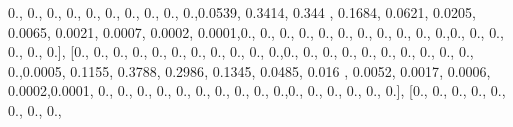 \documentclass[
]{book}
\newenvironment{Shaded}{\begin{snugshade}}{\end{snugshade}}
\newcommand{\FloatTok}[1]{\textcolor[rgb]{0.00,0.00,0.81}{#1}}
\newcommand{\NormalTok}[1]{#1}
\begin{document}
\begin{Shaded}
\begin{Highlighting}[]
\FloatTok{0.}\NormalTok{, }\FloatTok{0.}\NormalTok{, }\FloatTok{0.}\NormalTok{, }\FloatTok{0.}\NormalTok{, }\FloatTok{0.}\NormalTok{, }\FloatTok{0.}\NormalTok{, }\FloatTok{0.}\NormalTok{, }\FloatTok{0.}\NormalTok{, }\FloatTok{0.}\NormalTok{, }\FloatTok{0.}\NormalTok{,}\FloatTok{0.0539}\NormalTok{, }\FloatTok{0.3414}\NormalTok{, }\FloatTok{0.344}\NormalTok{ , }\FloatTok{0.1684}\NormalTok{, }\FloatTok{0.0621}\NormalTok{,}
\FloatTok{0.0205}\NormalTok{, }\FloatTok{0.0065}\NormalTok{, }\FloatTok{0.0021}\NormalTok{, }\FloatTok{0.0007}\NormalTok{, }\FloatTok{0.0002}\NormalTok{, }\FloatTok{0.0001}\NormalTok{,}\FloatTok{0.}\NormalTok{, }\FloatTok{0.}\NormalTok{, }\FloatTok{0.}\NormalTok{, }\FloatTok{0.}\NormalTok{, }\FloatTok{0.}\NormalTok{, }\FloatTok{0.}\NormalTok{, }\FloatTok{0.}\NormalTok{, }\FloatTok{0.}\NormalTok{,}
\FloatTok{0.}\NormalTok{, }\FloatTok{0.}\NormalTok{, }\FloatTok{0.}\NormalTok{,}\FloatTok{0.}\NormalTok{, }\FloatTok{0.}\NormalTok{, }\FloatTok{0.}\NormalTok{, }\FloatTok{0.}\NormalTok{, }\FloatTok{0.}\NormalTok{, }\FloatTok{0.}\NormalTok{], [}\FloatTok{0.}\NormalTok{, }\FloatTok{0.}\NormalTok{, }\FloatTok{0.}\NormalTok{, }\FloatTok{0.}\NormalTok{, }\FloatTok{0.}\NormalTok{, }\FloatTok{0.}\NormalTok{, }\FloatTok{0.}\NormalTok{, }\FloatTok{0.}\NormalTok{, }\FloatTok{0.}\NormalTok{, }\FloatTok{0.}\NormalTok{,}
\FloatTok{0.}\NormalTok{,}\FloatTok{0.}\NormalTok{, }\FloatTok{0.}\NormalTok{, }\FloatTok{0.}\NormalTok{, }\FloatTok{0.}\NormalTok{, }\FloatTok{0.}\NormalTok{, }\FloatTok{0.}\NormalTok{, }\FloatTok{0.}\NormalTok{, }\FloatTok{0.}\NormalTok{, }\FloatTok{0.}\NormalTok{, }\FloatTok{0.}\NormalTok{, }\FloatTok{0.}\NormalTok{,}\FloatTok{0.0005}\NormalTok{, }\FloatTok{0.1155}\NormalTok{, }\FloatTok{0.3788}\NormalTok{, }\FloatTok{0.2986}\NormalTok{,}
\FloatTok{0.1345}\NormalTok{, }\FloatTok{0.0485}\NormalTok{, }\FloatTok{0.016}\NormalTok{ , }\FloatTok{0.0052}\NormalTok{, }\FloatTok{0.0017}\NormalTok{, }\FloatTok{0.0006}\NormalTok{, }\FloatTok{0.0002}\NormalTok{,}\FloatTok{0.0001}\NormalTok{, }\FloatTok{0.}\NormalTok{, }\FloatTok{0.}\NormalTok{, }\FloatTok{0.}\NormalTok{, }\FloatTok{0.}\NormalTok{,}
\FloatTok{0.}\NormalTok{, }\FloatTok{0.}\NormalTok{, }\FloatTok{0.}\NormalTok{, }\FloatTok{0.}\NormalTok{, }\FloatTok{0.}\NormalTok{, }\FloatTok{0.}\NormalTok{,}\FloatTok{0.}\NormalTok{, }\FloatTok{0.}\NormalTok{, }\FloatTok{0.}\NormalTok{, }\FloatTok{0.}\NormalTok{, }\FloatTok{0.}\NormalTok{, }\FloatTok{0.}\NormalTok{], [}\FloatTok{0.}\NormalTok{, }\FloatTok{0.}\NormalTok{, }\FloatTok{0.}\NormalTok{, }\FloatTok{0.}\NormalTok{, }\FloatTok{0.}\NormalTok{, }\FloatTok{0.}\NormalTok{, }\FloatTok{0.}\NormalTok{, }\FloatTok{0.}\NormalTok{,}

\end{Highlighting}
\end{Shaded}
\end{document}
